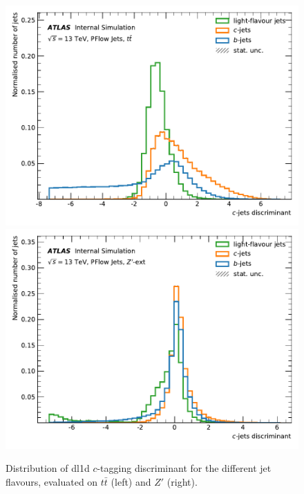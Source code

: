 \begin{center}
\begin{figure}[h!]
{\includegraphics[scale=0.5]{Images/FTAG/Reprocessed/plotting_variables_c/scores_DL1_ttbar_c_299.pdf}
\includegraphics[scale=0.5]{Images/FTAG/Reprocessed/plotting_variables_c/scores_DL1_zprime_c_299.pdf}
}
\caption{Distribution of \gls{dl1d} $c$-tagging discriminant for the different jet flavours, evaluated on $t\bar{t}$ (left) and $Z'$ (right).}
\label{fig:scoreDL1dz}
\end{figure}
\end{center}
%

